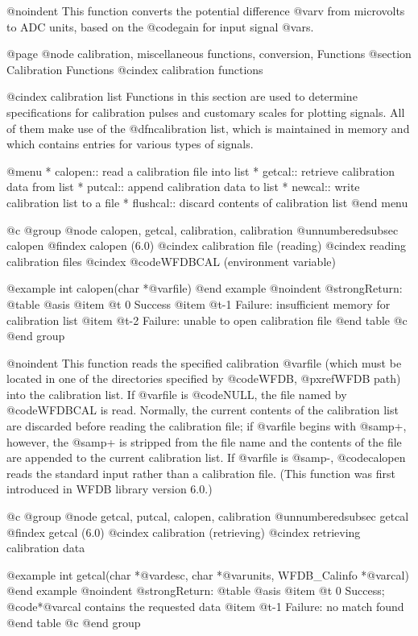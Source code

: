 {{{{{{{{@noindent
This function converts the potential difference @var{v} from microvolts
to ADC units, based on the @code{gain} for input signal @var{s}.

@page
@node     calibration, miscellaneous functions, conversion, Functions
@section Calibration Functions
@cindex calibration functions

@cindex calibration list
Functions in this section are used to determine specifications for
calibration pulses and customary scales for plotting signals.  All of
them make use of the @dfn{calibration list}, which is maintained in
memory and which contains entries for various types of signals.

@menu
* calopen::			read a calibration file into list
* getcal::			retrieve calibration data from list
* putcal::			append calibration data to list
* newcal::			write calibration list to a file
* flushcal::			discard contents of calibration list
@end menu

@c @group
@node   calopen, getcal, calibration, calibration
@unnumberedsubsec calopen
@findex calopen (6.0)
@cindex calibration file (reading)
@cindex reading calibration files
@cindex @code{WFDBCAL} (environment variable)

@example
int calopen(char *@var{file})
@end example
@noindent
@strong{Return:}
@table @asis
@item @t{ 0}
Success
@item @t{-1}
Failure: insufficient memory for calibration list
@item @t{-2}
Failure: unable to open calibration file
@end table
@c @end group

@noindent
This function reads the specified calibration @var{file} (which must be
located in one of the directories specified by @code{WFDB},
@pxref{WFDB path}) into the calibration list.  If @var{file} is
@code{NULL}, the file named by @code{WFDBCAL} is read.  Normally, the
current contents of the calibration list are discarded before reading
the calibration file; if @var{file} begins with @samp{+}, however, the
@samp{+} is stripped from the file name and the contents of the file are
appended to the current calibration list.  If @var{file} is @samp{-},
@code{calopen} reads the standard input rather than a calibration file.
(This function was first introduced in WFDB library version 6.0.)

@c @group
@node   getcal, putcal, calopen, calibration
@unnumberedsubsec getcal
@findex getcal (6.0)
@cindex calibration (retrieving)
@cindex retrieving calibration data

@example
int getcal(char *@var{desc}, char *@var{units}, WFDB_Calinfo *@var{cal})
@end example
@noindent
@strong{Return:}
@table @asis
@item @t{ 0}
Success;  @code{*@var{cal}} contains the requested data
@item @t{-1}
Failure: no match found
@end table
@c @end group

}}}}}}}}
